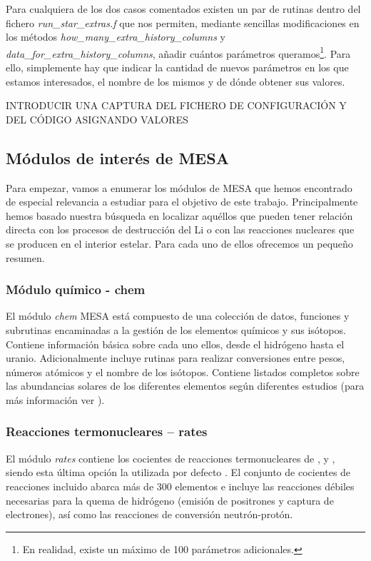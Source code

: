 Para cualquiera de los dos casos comentados existen un par de rutinas dentro del fichero \textit{run\_star\_extras.f} que nos permiten, mediante sencillas modificaciones en los métodos \textit{how\_many\_extra\_history\_columns} y \textit{data\_for\_extra\_history\_columns}, añadir cuántos parámetros queramos\footnote{En realidad, existe un máximo de 100 parámetros adicionales.}. Para ello, simplemente hay que indicar la cantidad de nuevos parámetros en los que estamos interesados, el nombre de los mismos y de dónde obtener sus valores.\par

INTRODUCIR UNA CAPTURA DEL FICHERO DE CONFIGURACIÓN Y DEL CÓDIGO ASIGNANDO VALORES

\subsection{Módulos de interés de MESA}
Para empezar, vamos a enumerar los módulos de MESA que hemos encontrado de especial relevancia a estudiar para el objetivo de este trabajo. Principalmente hemos basado nuestra búsqueda en localizar aquéllos que pueden tener relación directa con los procesos de destrucción del Li o con las reacciones nucleares que se producen en el interior estelar. Para cada uno de ellos ofrecemos un pequeño resumen.

\subsubsection{Módulo químico - chem}
El módulo \textit{chem} MESA está compuesto de una colección de datos, funciones y subrutinas encaminadas a la gestión de los elementos químicos y sus isótopos. Contiene información básica sobre cada uno ellos, desde el hidrógeno hasta el uranio. Adicionalmente incluye rutinas para realizar conversiones entre pesos, números atómicos y el nombre de los isótopos. Contiene listados completos sobre las abundancias solares de los diferentes elementos según diferentes estudios (para más información ver \cite{Paxton2011}).\par

\subsubsection{Reacciones termonucleares – rates}
El módulo \textit{rates} contiene los cocientes de reacciones termonucleares de \cite{Caughlan1988}, y \cite{Angulo1999}, siendo esta última opción la utilizada por defecto \cite{Paxton2011}. El conjunto de cocientes de reacciones incluido abarca más de 300 elementos e incluye las reacciones débiles necesarias para la quema de hidrógeno (emisión de positrones y captura de electrones), así como las reacciones de conversión neutrón-protón.

